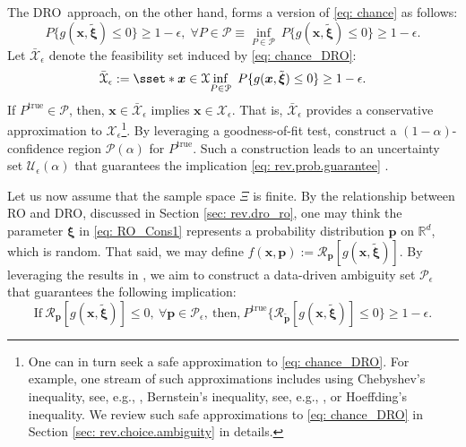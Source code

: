 \documentclass[final,onefignum,onetabnum]{class}
\newcommand{\rrisk}[2]{\Cs{R}_{#1} \left[ #2 \right]}
\newcommand{\bs}[1]{\boldsymbol{#1}} %
\newcommand{\Bs}[1]{\mathbb{#1}} %
\newcommand{\Cs}[1]{\mathcal{#1}} %
\newcommand{\txi}{\tilde{\bs{\xi}}}
\newcommand{\tbs}[1]{\tilde{\bs{#1}}}
\newcommand{\dro}{DRO}
\begin{document}
The \dro\ approach, on the other hand, forms a version of \eqref{eq: chance} as follows: 
\begin{equation}
\label{eq: chance_DRO}
P\{g(\bs{x}, \txi) \le 0 \} \ge 1-\epsilon, \; \forall P \in \Cs{P} \equiv \inf_{P \in \Cs{P}} \ P\{g(\bs{x}, \txi) \le 0 \} \ge 1-\epsilon. 
\end{equation}  
Let $\bar{\Cs{X}}_{\epsilon}$ denote the feasibility set induced by \eqref{eq: chance_DRO}: $$\bar{\Cs{X}}_{\epsilon}:=\sset*{ \bs{x} \in \Cs{X} }{\inf_{P \in \Cs{P}} \ P\{g(\bs{x}, \txi) \le 0 \} \ge 1-\epsilon}.$$ If $P^{\text{true}} \in \Cs{P}$, then, $\bs{x} \in \bar{\Cs{X}}_{\epsilon}  $ implies $\bs{x} \in \Cs{X}_{\epsilon}$. That is, $\bar{\Cs{X}}_{\epsilon} $ provides a conservative approximation to $\Cs{X}_{\epsilon}$\footnote{One can in turn seek a safe approximation to \eqref{eq: chance_DRO}. For example, one stream of such approximations includes using Chebyshev's inequality, see, e.g., \citet{popescu2005semidefinite,bertsimas2005optimal}, Bernstein's inequality, see, e.g., \citet{nemirovski2006convex},
or Hoeffding's inequality. We review such safe approximations to \eqref{eq: chance_DRO} in Section \ref{sec: rev.choice.ambiguity} in details.}. 
By leveraging a goodness-of-fit test, \citet{bertsimas2018RO} construct a $(1-\alpha)$-confidence region $\Cs{P}(\alpha)$ for $P^{\text{true}}$. Such a construction leads to an uncertainty set $\Cs{U}_{\epsilon}(\alpha)$ that guarantees the implication \eqref{eq: rev.prob.guarantee} \cite{bertsimas2018RO}.

Let us now assume that the sample space $\Xi$ is finite. By the relationship between RO and \dro, discussed in Section \ref{sec: rev.dro_ro}, one may think the parameter $\bs{\xi}$  in \eqref{eq: RO_Cons1} represents a probability distribution $\bs{p}$ on $\Bs{R}^{d}$, which is random. That said, we may define $f(\bs{x}, \bs{p}):=\rrisk{\bs{p}}{g(\bs{x}, \txi)}$. By leveraging the results in \citet{bertsimas2018RO}, we aim  to construct a data-driven ambiguity set $\Cs{P}_{\epsilon}$ that  guarantees the following implication: 
\begin{equation}
\label{eq: rev.prob.guarantee_dro}
	\text{If} \  \rrisk{\bs{p}}{g(\bs{x}, \txi)} \le 0, \ \forall \bs{p} \in \Cs{P}_{\epsilon}, \ \text{then,} \ P^{\text{true}}\{\rrisk{\tbs{p}}{g(\bs{x}, \txi)} \le 0 \} \ge 1-\epsilon. \tag{C2}
\end{equation}
\end{document}
